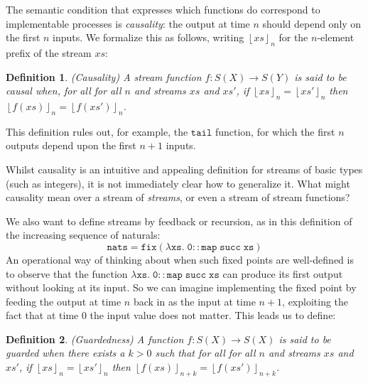 \documentclass[nocopyrightspace,preprint]{sigplanconf}
\newcommand{\term}[1]{\ensuremath{\mathtt{{#1}}}}
\newcommand{\floor}[1]{\left\lfloor{#1}\right\rfloor}
\newtheorem{definition}{Definition}
\begin{document}
The semantic condition that expresses which functions do correspond to implementable processes is \emph{causality}: 
the output at time $n$ should depend only on the first $n$ inputs. We 
formalize this as follows, writing $\floor{xs}_n$ for the 
$n$-element prefix of the stream $xs$:
\begin{definition}{(Causality)}
A stream function $f : S(X) \to S(Y)$ is said to be \emph{causal} when,
for all for all $n$ and streams $xs$ and $xs'$, if $\floor{xs}_n = \floor{xs'}_n$
then $\floor{f(xs)}_n = \floor{f(xs')}_n$.   
\end{definition}
This definition rules out, for example, the \term{tail} function, for which the first
$n$ outputs depend upon the first $n+1$ inputs. 

Whilst causality is an intuitive and appealing definition for
streams of basic types (such as integers), it is not
immediately clear how to generalize it. What
might causality mean over a stream of \emph{streams}, or even a
stream of stream functions? 


We also want to define streams by feedback or recursion, as in this definition of the increasing sequence of naturals:
\begin{displaymath}
\term{nats = fix(\lambda xs.\; 0 :: map\;succ\;xs)}  
\end{displaymath}
An operational way of thinking about when such fixed points are well-defined is to
observe that the function \term{\lambda xs.\; 0 :: map\;succ\;xs} 
can produce its first output without looking at its input. So we can 
imagine implementing the fixed point by feeding the output at time $n$ back in as the input at time $n+1$, exploiting the fact that at 
time 0 the input value does not matter. This leads us to define:

\begin{definition}{(Guardedness)}
A function $f : S(X) \to S(X)$ is said to be \emph{guarded}
when there exists a $k > 0$ such that for all for all $n$ and streams
$xs$ and $xs'$, if $\floor{xs}_n = \floor{xs'}_n$ then
$\floor{f(xs)}_{n+k} = \floor{f(xs')}_{n+k}$.
\end{definition}
\end{document}
